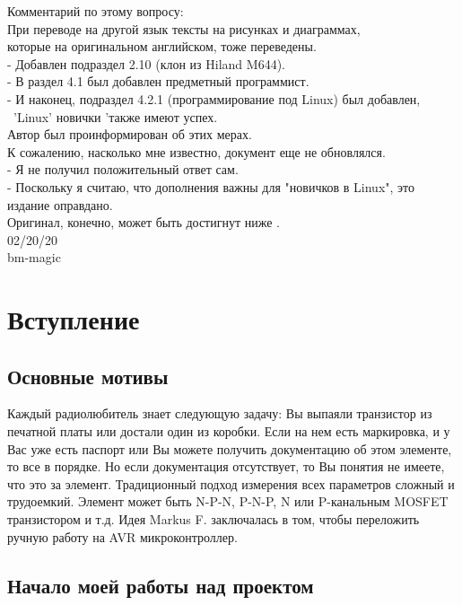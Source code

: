 Комментарий по этому вопросу:
\vspace*{0.3cm}
\\ При переводе на другой язык тексты на рисунках и диаграммах,
\\ которые на оригинальном английском, тоже переведены.
\\ - Добавлен подраздел 2.10 (клон из Hiland M644).
\\ - В раздел 4.1 был добавлен предметный программист.
\\ - И наконец, подраздел 4.2.1 (программирование под Linux) был добавлен,
\ 'Linux' новички 'также имеют успех.
\vspace*{0.3cm}
\\ Автор был проинформирован об этих мерах.
\\ К сожалению, насколько мне известно, документ еще не обновлялся.
\\ - Я не получил положительный ответ сам.
\\ - Поскольку я считаю, что дополнения важны для "новичков в Linux", это издание оправдано.
\vspace*{0.3cm}
\\ Оригинал, конечно, может быть достигнут ниже \cite{khk}.
\vspace*{0.3cm}
\\ 02/20/20
\\ bm-magic
\newpage
\section*{Вступление}
\subsection*{Основные мотивы}

Каждый радиолюбитель знает следующую задачу: Вы выпаяли транзистор из печатной платы или достали один из коробки. 
Если на нем есть маркировка, и у Вас уже есть паспорт или Вы можете получить документацию об этом элементе, то все 
в порядке. Но если документация отсутствует, то Вы понятия не имеете, что это за элемент. Традиционный подход измерения 
всех параметров сложный и трудоемкий. Элемент может быть N-P-N, P-N-P, N или P-канальным MOSFET транзистором и т.д. 
Идея Markus F. заключалась в том, чтобы переложить ручную работу на AVR микроконтроллер.
\subsection*{Начало моей работы над проектом}

